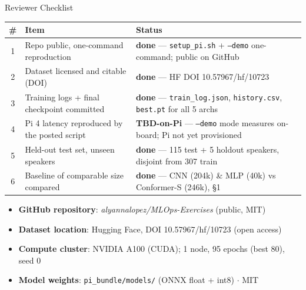 \documentclass[aspectratio=169,10pt]{beamer}
\newcommand{\OK}{\textcolor{okgreen}{\textbf{done}}}
\newcommand{\TBD}{\textcolor{tbdgray}{\textbf{TBD-on-Pi}}}
\begin{document}
\begin{frame}{Reviewer Checklist}
\small
\begin{table}
\centering
\begin{tabular}{@{}clp{7.6cm}@{}}
\toprule
\textbf{\#} & \textbf{Item} & \textbf{Status} \\
\midrule
1 & Repo public, one-command reproduction & \OK{} --- \texttt{setup\_pi.sh} + \texttt{--demo} one-command; public on GitHub \\
2 & Dataset licensed and citable (DOI) & \OK{} --- HF DOI 10.57967/hf/10723 \\
3 & Training logs + final checkpoint committed & \OK{} --- \texttt{train\_log.json}, \texttt{history.csv}, \texttt{best.pt} for all 5 archs \\
4 & Pi 4 latency reproduced by the posted script & \TBD{} --- \texttt{--demo} mode measures on-board; Pi not yet provisioned \\
5 & Held-out test set, unseen speakers & \OK{} --- 115 test + 5 holdout speakers, disjoint from 307 train \\
6 & Baseline of comparable size compared & \OK{} --- CNN (204k) \& MLP (40k) vs Conformer-S (246k), \S1 \\
\bottomrule
\end{tabular}
\end{table}

\vspace{0.5em}
\begin{itemize}\small
\item \textbf{GitHub repository}: \emph{alyannalopez/MLOps-Exercises} (public, MIT)
\item \textbf{Dataset location}: Hugging Face, DOI 10.57967/hf/10723 (open access)
\item \textbf{Compute cluster}: NVIDIA A100 (CUDA); 1 node, 95 epochs (best 80), seed 0
\item \textbf{Model weights}: \texttt{pi\_bundle/models/} (ONNX float + int8) $\cdot$ MIT
\end{itemize}
\end{frame}
\end{document}

